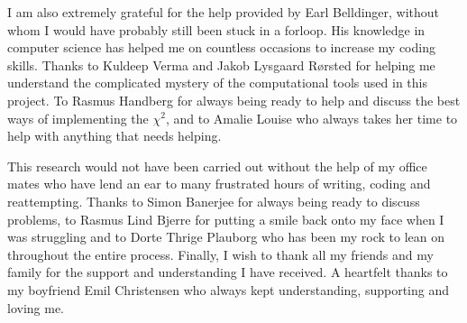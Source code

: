 \documentclass[a4paper,twoside,11pt]{memoir}
\newcommand{\chis}{\ensuremath{\chi^2}\xspace}
\begin{document}
I am also extremely grateful for the help provided by Earl Belldinger, without whom I would have probably still been stuck in a forloop. His knowledge in computer science has helped me on countless occasions to  increase my coding skills.  Thanks to Kuldeep Verma and Jakob Lysgaard Rørsted for helping me understand the complicated mystery of the computational tools used in this project. To Rasmus Handberg for always being ready to help and discuss the best ways of implementing the \chis, and to Amalie Louise who always takes her time to help with anything that needs helping.  

This research would not have been carried out without the help of my office mates who have lend an ear to many frustrated hours of writing, coding and reattempting. Thanks to Simon Banerjee for always being ready to discuss problems, to Rasmus Lind Bjerre for putting a smile back onto my face when I was struggling and to Dorte Thrige Plauborg who has been my rock to lean on throughout the entire process. 
Finally, I wish to thank all my friends and my family for the support and understanding I have received. A heartfelt thanks to my boyfriend Emil Christensen who always kept understanding, supporting and loving me. 

\newpage
\tableofcontents














\end{document}
